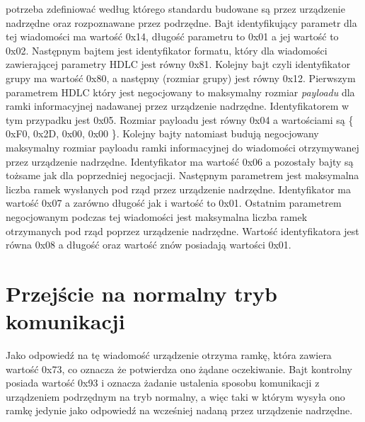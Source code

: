 potrzeba zdefiniować według którego standardu budowane są przez urządzenie nadrzędne oraz rozpoznawane przez podrzędne.
Bajt identyfikujący parametr dla tej wiadomości ma wartość 0x14, długość parametru to 0x01 a jej wartość to 0x02.
\newline
Następnym bajtem jest identyfikator formatu, który dla wiadomości zawierającej parametry HDLC jest równy 0x81.
\newline
Kolejny bajt czyli identyfikator grupy ma wartość 0x80, a następny (rozmiar grupy) jest równy 0x12.
\newline
Pierwszym parametrem HDLC który jest negocjowany to maksymalny rozmiar \textit{payloadu} dla ramki informacyjnej nadawanej przez urządzenie nadrzędne.
Identyfikatorem w tym przypadku jest 0x05. Rozmiar payloadu jest równy 0x04 a wartościami są \{ 0xF0, 0x2D, 0x00, 0x00 \}.
\newline
Kolejny bajty natomiast budują negocjowany maksymalny rozmiar payloadu ramki informacyjnej do wiadomości otrzymywanej przez urządzenie nadrzędne.
Identyfikator ma wartość 0x06 a pozostały bajty są tożsame jak dla poprzedniej
negocjacji.
\newline
Następnym parametrem jest maksymalna liczba ramek wysłanych pod rząd przez urządzenie nadrzędne. Identyfikator ma wartość 0x07 a zarówno długość jak i wartość to 0x01.
\newline
Ostatnim parametrem negocjowanym podczas tej wiadomości jest maksymalna liczba ramek otrzymanych pod rząd poprzez urządzenie nadrzędne.
Wartość identyfikatora jest równa 0x08 a długość oraz wartość znów posiadają wartości 0x01.
\section{Przejście na normalny tryb komunikacji}
Jako odpowiedź na tę wiadomość urządzenie otrzyma ramkę, która zawiera wartość 0x73, co oznacza że 
potwierdza ono żądane oczekiwanie.
\newline\newline
Bajt kontrolny posiada wartość 0x93 i oznacza żadanie ustalenia sposobu komunikacji z urządzeniem podrzędnym na tryb normalny, 
a więc taki w którym wysyła ono ramkę jedynie jako odpowiedź na wcześniej nadaną przez urządzenie nadrzędne.
